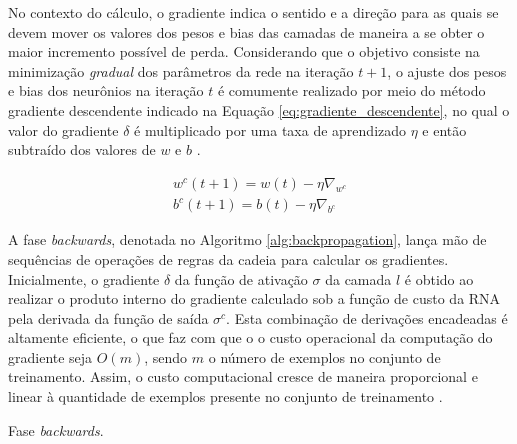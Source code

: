 No contexto do cálculo, o gradiente indica o sentido e a direção para as quais se devem mover os valores dos pesos e bias das camadas de maneira a se obter o maior incremento possível de perda. Considerando que o objetivo consiste na minimização \emph{gradual} dos parâmetros da rede na iteração $t+1$, o ajuste dos pesos e bias dos neurônios na iteração $t$ é comumente realizado por meio do método gradiente descendente indicado na Equação \ref{eq:gradiente_descendente}, no qual o valor do gradiente $\delta$ é multiplicado por uma taxa de aprendizado $\eta$ e então subtraído dos valores de $w$ e $b$ \cite{haykin2009neural, goodfellow2016deep}.

\begin{gather}\label{eq:gradiente_descendente}
	w^c(t+1) = w(t) - \eta \nabla_{w^c} \\
	b^c(t+1) = b(t) - \eta \nabla_{b^c}
\end{gather}

A fase \emph{backwards}, denotada no Algoritmo \ref{alg:backpropagation}, lança mão de sequências de operações de regras da cadeia para calcular os gradientes. Inicialmente, o gradiente $\delta$ da função de ativação $\sigma$ da camada $l$ é obtido ao realizar o produto interno do gradiente calculado sob a função de custo da RNA pela derivada da função de saída $\sigma^c$. Esta combinação de derivações encadeadas é altamente eficiente, o que faz com que o o custo operacional da computação do gradiente seja $O(m)$, sendo $m$ o número de exemplos no conjunto de treinamento. Assim, o custo computacional cresce de maneira proporcional e linear à quantidade de exemplos presente no conjunto de treinamento \cite{haykin2009neural, goodfellow2016deep}.

\begin{algorithm}
	\caption{Fase \emph{backwards}.}\label{alg:backpropagation}
\end{algorithm}

